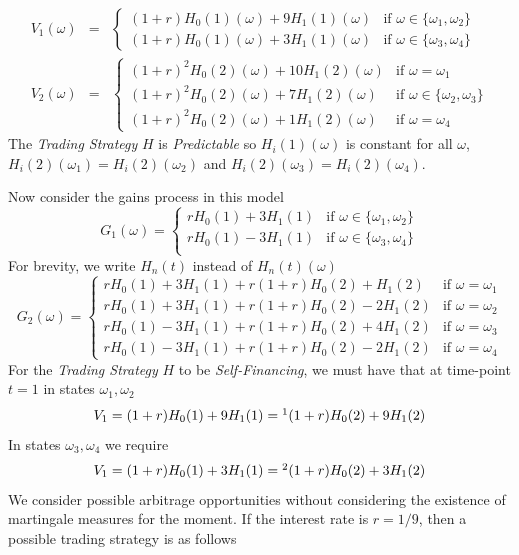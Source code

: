 \documentclass[11pt,a4paper]{article}
\begin{document}
\begin{example}{}
\[\begin{array}{rcl}
      V_1(\omega)&=&\begin{cases}
        (1+r)H_0(1)(\omega)+9H_1(1)(\omega)&\text{if }\omega\in\{\omega_1,\omega_2\}\\
        (1+r)H_0(1)(\omega)+3H_1(1)(\omega)&\text{if }\omega\in\{\omega_3,\omega_4\}
      \end{cases}\\
      V_2(\omega)&=&\begin{cases}
        (1+r)^2H_0(2)(\omega)+10H_1(2)(\omega)&\text{if }\omega=\omega_1\\
        (1+r)^2H_0(2)(\omega)+7H_1(2)(\omega)&\text{if }\omega\in\{\omega_2,\omega_3\}\\
        (1+r)^2H_0(2)(\omega)+1H_1(2)(\omega)&\text{if }\omega=\omega_4
      \end{cases}
    \end{array}\]
    The \textit{Trading Strategy} $H$ is \textit{Predictable} so $H_i(1)(\omega)$ is constant for all $\omega$,
    $H_i(2)(\omega_1)=H_i(2)(\omega_2)$ and $H_i(2)(\omega_3)=H_i(2)(\omega_4)$.
    \par Now consider the gains process in this model
    \[ G_1(\omega)=\begin{cases}
      rH_0(1)+3H_1(1)&\text{if }\omega\in\{\omega_1,\omega_2\}\\
      rH_0(1)-3H_1(1)&\text{if }\omega\in\{\omega_3,\omega_4\}\\
    \end{cases} \]
    For brevity, we write $H_n(t)$ instead of $H_n(t)(\omega)$
    \[ G_2(\omega)=\begin{cases}
      rH_0(1)+3H_1(1)+r(1+r)H_0(2)+H_1(2)&\text{if }\omega=\omega_1\\
      rH_0(1)+3H_1(1)+r(1+r)H_0(2)-2H_1(2)&\text{if }\omega=\omega_2\\
      rH_0(1)-3H_1(1)+r(1+r)H_0(2)+4H_1(2)&\text{if }\omega=\omega_3\\
      rH_0(1)-3H_1(1)+r(1+r)H_0(2)-2H_1(2)&\text{if }\omega=\omega_4
    \end{cases} \]
    For the \textit{Trading Strategy} $H$ to be \textit{Self-Financing}, we must have that at time-point $t=1$ in states $\omega_1,\omega_2$
    \[ V_1=(1+r)H_0(1)+9H_1(1)=\footnotemark(1+r)H_0(2)+9H_1(2) \]
    In states $\omega_3,\omega_4$ we require
    \[ V_1=(1+r)H_0(1)+3H_1(1)=\footnotemark(1+r)H_0(2)+3H_1(2) \]
    We consider possible arbitrage opportunities without considering the existence of martingale measures for the moment. If the interest rate is $r=1/9$, then a possible trading strategy is as follows

\end{example}
\end{document}
